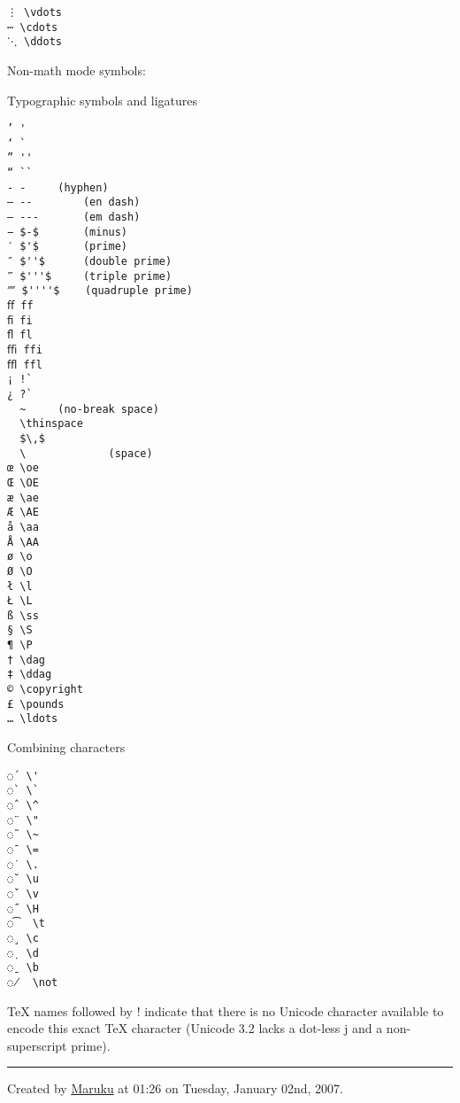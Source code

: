 \documentclass{article}
\begin{document}
\begin{verbatim}⋮ \vdots
⋯ \cdots
⋱ \ddots
\end{verbatim}
Non-math mode symbols:

Typographic symbols and ligatures

\begin{verbatim}’ '
‘ `
” ''
“ ``
‐ -		(hyphen)
– --		(en dash)
— ---		(em dash)
− $-$		(minus)
′ $'$		(prime)
″ $''$		(double prime)
‴ $'''$		(triple prime)
⁗ $''''$	(quadruple prime)
ﬀ ff
ﬁ fi
ﬂ fl
ﬃ ffi
ﬄ ffl
¡ !`
¿ ?`
  ~		(no-break space)
  \thinspace
  $\,$
  \             (space)
œ \oe
Œ \OE
æ \ae
Æ \AE
å \aa
Å \AA
ø \o
Ø \O
ł \l
Ł \L
ß \ss
§ \S
¶ \P
† \dag
‡ \ddag
© \copyright
£ \pounds
… \ldots
\end{verbatim}
Combining characters

\begin{verbatim}◌́  \'
◌̀  \`
◌̂  \^
◌̈  \"
◌̃  \~
◌̄  \=
◌̇  \.
◌̆  \u
◌̌  \v
◌̋  \H
◌͡  \t
◌̧  \c
◌̣  \d
◌̱  \b
◌̸  \not
\end{verbatim}
TeX names followed by ! indicate that there is no Unicode character available to encode this exact TeX character (Unicode 3.2 lacks a dot-less j and a non-superscript prime).

\vfill
\hrule
\vspace{1.2mm}
\begin{tiny}
Created by \href{http://maruku.rubyforge.org}{Maruku}  at 01:26 on Tuesday, January 02nd, 2007.
\end{tiny}
\end{document}

